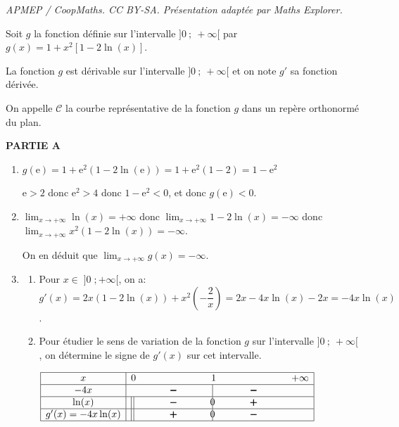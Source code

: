 \documentclass[10pt]{article}
\providecommand{\e}{{\mathrm{e}}}
\providecommand{\ds}{\displaystyle}
\begin{document}
\noindent\textit{APMEP / CoopMaths. CC BY-SA. Présentation adaptée par Maths Explorer.}\par\medskip
\medskip

Soit $g$ la fonction définie sur l'intervalle $]0~;~+\infty[$ par 
$g(x) = 1+ x^2[1 - 2 \ln (x)].$

La fonction $g$ est dérivable sur l'intervalle $]0~;~+\infty[$ et on note $g'$ sa fonction dérivée.

On appelle $\mathcal{C}$ la courbe représentative de la fonction $g$ dans un repère orthonormé du plan.

\medskip

\textbf{PARTIE A}



\begin{enumerate}
\item $g(\text{e}) = 1+\e^2\left (1-2\ln(\e)\right ) = 1+\e^2\left (1-2\right ) 
=1-\e^2$

$\e>2$ donc $\e^2>4$ donc $1-\e^2<0$, et donc $g(\e)<0$.

\item 
$\ds\lim_{x \to +\infty} \ln(x)=+\infty$ donc $\ds\lim_{x \to +\infty} 1-2\ln(x) = -\infty$ donc $\ds\lim_{x \to +\infty} x^2\left (1-2\ln(x)\right )=-\infty$.

On en déduit que $\ds\lim_{x \to + \infty} g(x) = - \infty$.

\item 
	\begin{enumerate}
		\item 
Pour $x\in\;]0\;; +\infty[$, on a:	\\
$g'(x)=2x\left (1-2\ln(x)\right ) + x^2\left (-\dfrac{2}{x}\right )
= 2x -4x\ln(x) -2x=-4x\ln(x)$.	
		
		\item Pour étudier le sens de variation de la fonction $g$ sur l'intervalle $]0~;~+\infty[$, on détermine le signe de $g'(x)$ sur cet intervalle.
		
\begin{center}
{\renewcommand{\arraystretch}{1.5}
\def\esp{\hspace*{2cm}}
$\begin{array}{|c | l*{4}{c} |} 
\hline
x  & 0 & \esp & 1 & \esp  & +\infty \\
\hline
-4x &  & \pmb{-} &  \vline\hspace{-2.7pt}{\phantom 0} & \pmb{-} &   \\
\hline
\ln(x) &\vline\:\vline  & \pmb{-} &  \vline\hspace{-2.7pt}{0} & \pmb{+} &   \\
\hline
g'(x)=-4x\ln(x) & \vline\:\vline & \pmb{+} &  \vline\hspace{-2.7pt}{0} & \pmb{-} &   \\
\hline
\end{array}$
}
\end{center}
		

\end{enumerate}
\end{enumerate}
\end{document}
